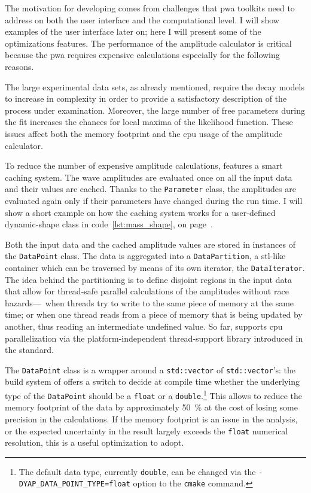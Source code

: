     The motivation for developing  comes from challenges that \ac{pwa} toolkits need to address on both the user interface and the computational level.
    I will show examples of the user interface later on; here I will present some of the optimizations  features.
    The performance of the amplitude calculator is critical because the \ac{pwa} requires expensive calculations especially for the following reasons.


    The large experimental data sets, as already mentioned, require the decay models to increase in complexity in order to provide a satisfactory description of the process under examination.
    Moreover, the large number of free parameters during the fit increases the chances for local maxima of the likelihood function.
    These issues affect both the memory footprint and the \acs{cpu} usage of the amplitude calculator.


    To reduce the number of expensive amplitude calculations,  features a smart caching system.
    The wave amplitudes are evaluated once on all the input data and their values are cached.
    Thanks to the \lstinline!Parameter! class, the amplitudes are evaluated again only if their parameters have changed during the run time.
    I will show a short example on how the caching system works for a user-defined dynamic-shape class in code~\ref{lst:mass_shape}, on page~\pageref{lst:mass_shape}.


    Both the input data and the cached amplitude values are stored in instances of the \lstinline!DataPoint! class.
    The data is aggregated into a \lstinline!DataPartition!, a \ac{stl}-like container which can be traversed by means of its own iterator, the \lstinline!DataIterator!.
    The idea behind the partitioning is to define disjoint regions in the input data that allow for thread-safe parallel calculations of the amplitudes without race hazards---\ie~when threads try to write to the same piece of memory at the same time; or when one thread reads from a piece of memory that is being updated by another, thus reading an intermediate undefined value.
    So far,  supports \acs{cpu} parallelization via the platform-independent thread-support library introduced in the \cpp[11]{} standard.


    The \lstinline!DataPoint! class is a wrapper around a \lstinline!std::vector! of \lstinline!std::vector!'s: the build system of  offers a switch to decide at compile time whether the underlying type of the \lstinline!DataPoint! should be a \lstinline!float! or a \lstinline!double!.\footnote{The default data type, currently \lstinline!double!, can be changed via the \lstinline[language=bash]|-DYAP_DATA_POINT_TYPE=float| option to the \lstinline!cmake! command.}
    This allows to reduce the memory footprint of the data by approximately \SI{50}{\percent} at the cost of losing some precision in the calculations.
    If the memory footprint is an issue in the analysis, or the expected uncertainty in the result largely exceeds the \lstinline!float! numerical resolution, this is a useful optimization to adopt.


